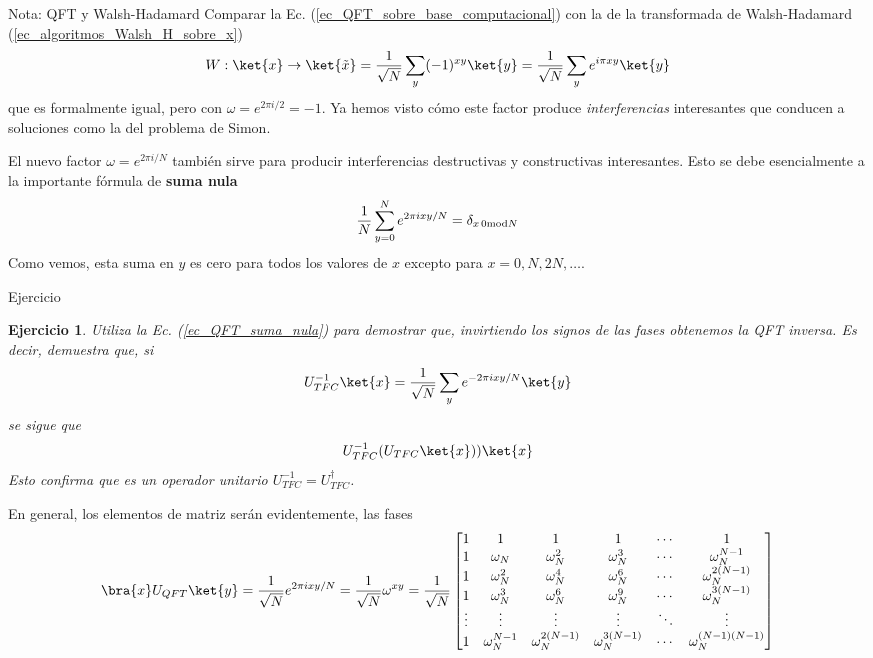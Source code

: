 \documentclass[a4paper,11pt]{book} %
\newtheorem{ejercicio_contador}{Ejercicio}
\newcommand{\Ejercicio}[1]{
		\begin{mybox_gray}{Ejercicio} 
			\begin{ejercicio_contador}
				 #1 
			\end{ejercicio_contador} 
		\end{mybox_gray}
	}
\numberwithin{equation}{chapter}
\begin{document}
	\begin{mybox_blue}{Nota: QFT y Walsh-Hadamard}
	Comparar la Ec. (\ref{ec_QFT_sobre_base_computacional}) con la de la transformada de Walsh-Hadamard (\ref{ec_algoritmos_Walsh_H_sobre_x})
	$$
	W: \ket{x} \to \ket{\tilde x} =  \frac{1}{\sqrt{N}}\sum_{y}(-1)^{xy}\ket{y} =   \frac{1}{\sqrt{N}}\sum_{y} e^{i\pi   xy} \ket{y} 
	$$
	que es formalmente igual, pero con $\omega = e^{2\pi i/2} = -1$.
    Ya hemos visto cómo este factor produce \textit{interferencias} interesantes que conducen a soluciones como la del problema de Simon. 
	\end{mybox_blue}

El nuevo factor $\omega = e^{2\pi i/N}$ también sirve para producir interferencias destructivas y constructivas interesantes. Esto se debe esencialmente a la importante fórmula de \textbf{suma nula}
	\begin{equation} \label{ec_QFT_suma_nula}
	\frac{1}{N} \sum_{y=0}^{N} e^{2\pi i xy/N} = \delta_{x \, 0 {\rm mod}N}
	\end{equation}
Como vemos, esta suma en $y$ es cero para todos los valores de $x$ excepto para $x = 0, N, 2N, \dots$.

	\Ejercicio{
	Utiliza la Ec. (\ref{ec_QFT_suma_nula}) para demostrar que, invirtiendo los signos de las fases obtenemos la QFT inversa. Es decir, demuestra que, si  
	$$
	U^{-1}_{TFC}\ket{x}  =  \frac{1}{\sqrt{N}}\sum_{y} e^{-2\pi i  xy /N} \ket{y} 
	$$
	se sigue que     
	$$
	U_{TFC}^{-1}(U_{TFC} \ket{x}) ) \ket{x}
	$$
	Esto confirma que es un operador unitario $U_{TFC}^{-1} = U_{TFC}^\dagger$.
	}

En general, los elementos de matriz serán evidentemente, las fases
	\begin{equation*}
	\bra{x} U_{QFT} \ket{y} =  \frac{1}{\sqrt{N}} e^{2\pi i  x y/N} =\frac{1}{\sqrt{N}} \omega^{xy}
 = \frac{1}{\sqrt{N}} \begin{bmatrix}
1&1&1&1&\cdots &1 \\
1&\omega_N&\omega_N^2&\omega_N^3&\cdots&\omega_N^{N-1} \\
1&\omega_N^2&\omega_N^4&\omega_N^6&\cdots&\omega_N^{2(N-1)}\\ 1&\omega_N^3&\omega_N^6&\omega_N^9&\cdots&\omega_N^{3(N-1)}\\
\vdots&\vdots&\vdots&\vdots&\ddots&\vdots\\
1&\omega_N^{N-1}&\omega_N^{2(N-1)}&\omega_N^{3(N-1)}&\cdots&\omega_N^{(N-1)(N-1)}
\end{bmatrix}
	\end{equation*}
	
\end{document}
